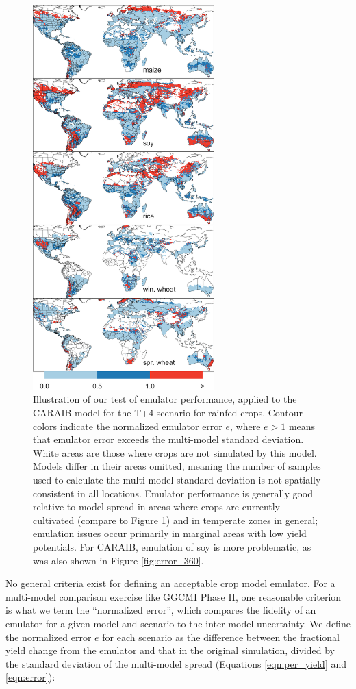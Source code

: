 \documentclass[esd, manuscript]{copernicus} %
\begin{document}
\begin{figure}[ht]
\centering
    \includegraphics[width=7cm]{figures/em_err.png}
    \caption{Illustration of our test of emulator performance, applied to the CARAIB model for the T+4 scenario for rainfed crops. Contour colors indicate the normalized emulator error $e$, where $e > 1$ means that emulator error exceeds the multi-model standard deviation. White areas are those where crops are not simulated by this model. Models differ in their areas omitted, meaning the number of samples used to calculate the multi-model standard deviation is not spatially consistent in all locations. Emulator performance is generally good relative to model spread in areas where crops are currently cultivated (compare to Figure 1) and in temperate zones in general; emulation issues occur primarily in marginal areas with low yield potentials. For CARAIB, emulation of soy is more problematic, as was also shown in Figure \ref{fig:error_360}.}
   \label{fig:error}
\end{figure}

No general criteria exist for defining an acceptable crop model emulator. For a multi-model comparison exercise like GGCMI Phase II, one reasonable criterion is what we term the ``normalized error'', which compares the fidelity of an emulator for a given model and scenario to the inter-model uncertainty. We define the normalized error $e$ for each scenario as the difference between the fractional yield change from the emulator and that in the original simulation, divided by the standard deviation of the multi-model spread (Equations \ref{eqn:per_yield} and  \ref{eqn:error}):
\end{document}

